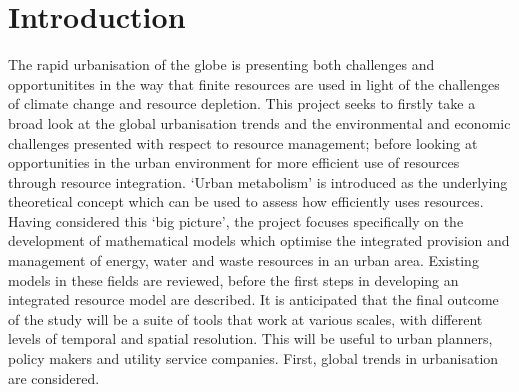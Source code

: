 \section{Introduction}
The rapid urbanisation of the globe is presenting both challenges and opportunitites in the way that finite resources are used in light of the challenges of climate change and resource depletion. This project seeks to firstly take a broad look at the global urbanisation trends and the environmental and economic challenges presented with respect to resource management; before looking at opportunities in the urban environment for more efficient use of resources through resource integration. `Urban metabolism' is introduced as the underlying theoretical concept which can be used to assess how efficiently uses resources. Having considered this `big picture', the project focuses specifically on the development of mathematical models which optimise the integrated provision and management of energy, water and waste resources in an urban area. Existing models in these fields are reviewed, before the first steps in developing an integrated resource model are described. It is anticipated that the final outcome of the study will be a suite of tools that work at various scales, with different levels of temporal and spatial resolution. This will be useful to urban planners, policy makers and utility service companies. First, global trends in urbanisation are considered.

